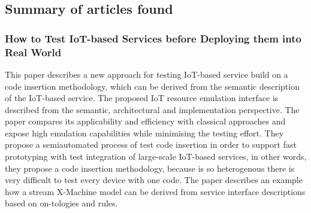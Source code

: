 
\subsection{Summary of articles found}

\subsubsection{How to Test IoT-based Services before Deploying them into Real World}\cite{Paper2}
This paper describes  a  new  approach  for  testing  IoT-based  service  build on  a  code  insertion  methodology,  which  can  be  derived  from the semantic description of the IoT-based service.
The proposed IoT resource emulation interface is described from the semantic, architectural  and  implementation  perspective.  The  paper  compares its applicability and efficiency with classical approaches and expose  high  emulation  capabilities  while  minimising  the  testing effort.
They propose a semiautomated process of test code insertion in order to support fast prototyping with test integration of large-scale IoT-based services, in other words, they propose a code insertion methodology, because \IoT is so heterogenous there is very difficult to test every device with one code.
The paper describes an example how a stream X-Machine model can be derived from service interface descriptions based on on-tologies and rules.

